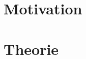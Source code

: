 \section{Motivation}
\begin{quote}
    
    
    
\end{quote} %



\section{Theorie}
\begin{quote}

    
    
    \end{quote}%

